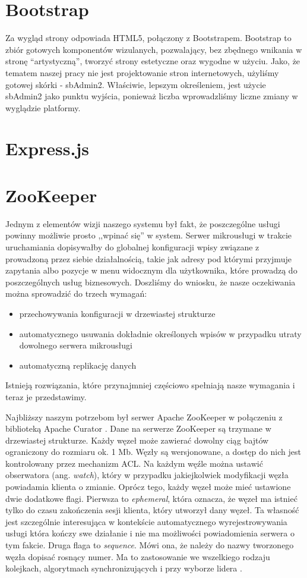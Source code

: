 \documentclass[licencjacka]{pracamgr}
\begin{document}
\section{Bootstrap}

Za wygląd strony odpowiada HTML5, połączony z Bootstrapem. Bootstrap to zbiór gotowych komponentów wizulanych, pozwalający, bez zbędnego wnikania
w stronę ``artystyczną'', tworzyć strony estetyczne oraz wygodne w użyciu. Jako, że tematem naszej pracy nie jest projektowanie stron internetowych,
użyliśmy gotowej skórki - sbAdmin2. Właściwie, lepszym określeniem, jest użycie sbAdmin2 jako punktu wyjścia, ponieważ liczba wprowadzliśmy
liczne zmiany w wyglądzie platformy.

\section{Express.js}

\section{ZooKeeper}

Jednym z elementów wizji naszego systemu był fakt, że poszczególne usługi
powinny możliwie prosto ,,wpinać się'' w system. Serwer mikrousługi w trakcie
uruchamiania dopisywałby do globalnej konfiguracji wpisy związane z prowadzoną
przez siebie działalnością, takie jak adresy pod którymi przyjmuje zapytania
albo pozycje w menu widocznym dla użytkownika, które prowadzą do poszczególnych
usług biznesowych. Doszliśmy do wniosku, że nasze oczekiwania można sprowadzić
do trzech wymagań:
\begin{itemize}
	\item przechowywania konfiguracji w drzewiastej strukturze
	\item automatycznego usuwania dokładnie określonych wpisów w przypadku
	utraty dowolnego serwera mikrousługi
	\item automatyczną replikację danych
\end{itemize}
Istnieją rozwiązania, które przynajmniej częściowo spełniają nasze wymagania i
teraz je przedstawimy.

Najbliższy naszym potrzebom był serwer Apache ZooKeeper \cite{zookeeper} w
połączeniu z biblioteką Apache Curator \cite{curator}. Dane na serwerze
ZooKeeper są trzymane w drzewiastej strukturze. Każdy węzeł może zawierać dowolny
ciąg bajtów ograniczony do rozmiaru ok. 1 Mb. Węzły są wersjonowane, a dostęp
do nich jest kontrolowany przez mechanizm ACL. Na każdym węźle można ustawić
obserwatora (ang. \textit{watch}), który w przypadku jakiejkolwiek modyfikacji
węzła powiadamia klienta o zmianie. Oprócz tego, każdy węzeł może mieć ustawione
dwie dodatkowe flagi. Pierwsza to \textit{ephemeral}, która oznacza, że węzeł ma
istnieć tylko do czasu zakończenia sesji klienta, który utworzył dany węzeł.
Ta własność jest szczególnie interesująca w kontekście automatycznego
wyrejestrowywania usługi która kończy swe działanie i nie ma możliwości
powiadomienia serwera o tym fakcie. Druga flaga to \textit{sequence}. Mówi ona,
że należy do nazwy tworzonego węzła dopisać rosnący numer. Ma to zastosowanie we
wszelkiego rodzaju kolejkach, algorytmach synchronizujących i przy wyborze
lidera \cite{curatorlock}.
\end{document}
